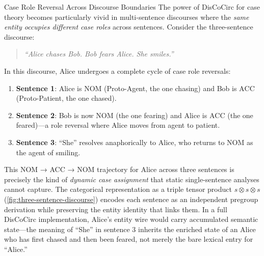 \documentclass[
  ignorenonframetext,
]{beamer}
\providecommand{\tightlist}{%
  \setlength{\itemsep}{0pt}\setlength{\parskip}{0pt}}
\begin{document}
\begin{frame}{Case Role Reversal Across Discourse Boundaries}
\protect{}\label{case-role-reversal-across-discourse-boundaries}
The power of DisCoCirc for case theory becomes particularly vivid in
multi-sentence discourses where the \emph{same entity occupies different
case roles} across sentences. Consider the three-sentence discourse:

\begin{quote}
\emph{``Alice chases Bob. Bob fears Alice. She smiles.''}
\end{quote}

In this discourse, Alice undergoes a complete cycle of case role
reversals:

\begin{enumerate}
\tightlist
\item
  \textbf{Sentence 1}: Alice is \(\text{NOM}\) (Proto-Agent, the one
  chasing) and Bob is \(\text{ACC}\) (Proto-Patient, the one chased).
\item
  \textbf{Sentence 2}: Bob is now \(\text{NOM}\) (the one fearing) and
  Alice is \(\text{ACC}\) (the one feared)---a role reversal where Alice
  moves from agent to patient.
\item
  \textbf{Sentence 3}: ``She'' resolves anaphorically to Alice, who
  returns to \(\text{NOM}\) as the agent of smiling.
\end{enumerate}

This NOM → ACC → NOM trajectory for Alice across three sentences is
precisely the kind of \emph{dynamic case assignment} that static
single-sentence analyses cannot capture. The categorical representation
as a triple tensor product \(s \otimes s \otimes s\)
(\autoref{fig:three-sentence-discourse}) encodes each sentence as an
independent pregroup derivation while preserving the entity identity
that links them. In a full DisCoCirc implementation, Alice's entity wire
would carry accumulated semantic state---the meaning of ``She'' in
sentence 3 inherits the enriched state of an Alice who has first chased
and then been feared, not merely the bare lexical entry for ``Alice.''


\end{frame}
\end{document}
